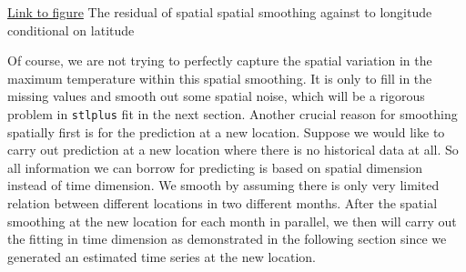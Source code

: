 \begin{framed}
\begin{center}
  \href{../plots/a1950/spaimpute/elev/d2/span0.015/a1950.spaResid.vs.lon.lat.pdf}
  {Link to figure}
  {The residual of spatial spatial smoothing against to longitude conditional on 
  latitude}
  \label{elev.0.015.Residvslon.lat}
\end{center}
\end{framed}

Of course, we are not trying to perfectly capture the spatial variation in the
maximum temperature within this spatial smoothing. It is only to fill in the 
missing values and smooth out some spatial noise, which will be a rigorous 
problem in \texttt{stlplus} fit in the next section. Another crucial reason for
smoothing spatially first is for the prediction at a new location. Suppose we 
would like to carry out prediction at a new location where there is no historical 
data at all. So all information we can borrow for predicting is based on spatial 
dimension instead of time dimension. We smooth by assuming there is only very 
limited relation between different locations in two different months. After the 
spatial smoothing at the new location for each month in parallel, we then will 
carry out the fitting in time dimension as demonstrated in the following section 
since we generated an estimated time series at the new location.

